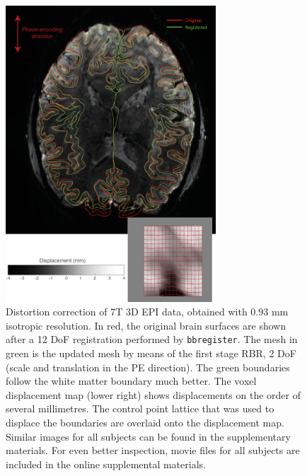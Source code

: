 \begin{figure}[!t]
\centering
\includegraphics[width=0.7\textwidth, clip=true]{./Chapters/02_Registration/Images/./EpiRegistration}
\caption{
	Distortion correction of 7T 3D EPI data, obtained with 0.93 mm isotropic resolution. In {\color{red}red}, the original brain surfaces are shown after a 12 DoF registration performed by \texttt{bbregister}. The mesh in {\color{green}green} is the updated mesh by means of the first stage RBR, 2 DoF (scale and translation in the PE direction). The green boundaries follow the white matter boundary much better. The voxel displacement map (lower right) shows displacements on the order of several millimetres. The control point lattice that was used to displace the boundaries are overlaid onto the displacement map. Similar images for all subjects can be found in the supplementary materials. For even better inspection, movie files for all subjects are included in the online supplemental materials.} 
\label{fig:epiregistration}
\end{figure}